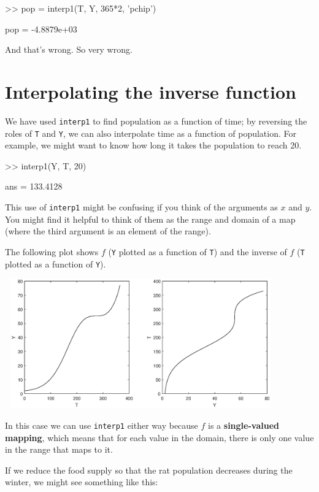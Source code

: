 \documentclass[
]{book}
\numberwithin{Answer}{chapter}
\numberwithin{Exercise}{chapter}
\begin{document}
\begin{code}
>> pop = interp1(T, Y, 365*2, 'pchip')

pop = -4.8879e+03
\end{code}

And that's wrong.  So very wrong.


\section{Interpolating the inverse function}

We have used {\tt interp1} to find population as a function of time;
by reversing the roles of {\tt T} and {\tt Y}, we can also interpolate
time as a function of population.  For example, we might want to know
how long it takes the population to reach 20.

\begin{code}
>> interp1(Y, T, 20)

ans = 133.4128
\end{code}

This use of {\tt interp1} might be confusing if you think of the
arguments as $x$ and $y$.  You might find it helpful to think of them
as the range and domain of a map (where the third argument is
an element of the range).

The following plot shows $f$ ({\tt Y} plotted as a function of {\tt T})
and the inverse of $f$ ({\tt T} plotted as a function of {\tt Y}).

\beforefig
\centerline{\includegraphics[height=2.2in,width=4.6in]{figs/ratplot.eps}}

In this case we can use {\tt interp1} either way because $f$ is
a {\bf single-valued mapping}, which means that for each value in
the domain, there is only one value in the range that maps to it.

If we reduce the food supply so that the rat population decreases
during the winter, we might see something like this:
\end{document}
